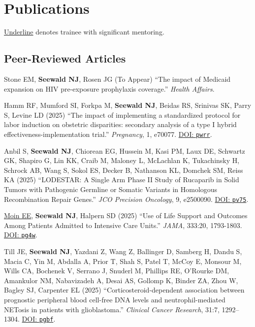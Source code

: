 \documentclass[letterpaper,11pt]{article} %
\begin{document}
	\section*{Publications}
    
    {\small \underline{Underline} denotes trainee with significant mentoring.}
    
	\subsection*{Peer-Reviewed Articles}
	
	\begin{etaremune}
        \item Stone EM, \textbf{Seewald NJ}, Rosen JG (To Appear) ``The impact of Medicaid expansion on HIV pre-exposure prophylaxis coverage.'' \textit{Health Affairs}.
        
        \item Hamm RF, Mumford SI, Forkpa M, \textbf{Seewald NJ}, Beidas RS, Srinivas SK, Parry S, Levine LD (2025) ``The impact of implementing a standardized protocol for labor induction on obstetric disparities: secondary analysis of a type I hybrid effectiveness-implementation trial.'' \textit{Pregnancy}, 1, e70077. \href{https://doi.org/pwrr}{DOI: \texttt{pwrr}}.
        
        \item Anbil S, \textbf{Seewald NJ}, Chiorean EG, Hussein M, Kasi PM, Laux DE, Schwartz GK, Shapiro G, Lin KK, Craib M, Maloney L, McLachlan K, Tukachinsky H, Schrock AB, Wang S, Sokol ES, Decker B, Nathanson KL, Domchek SM, Reiss KA (2025) ``LODESTAR: A Single Arm Phase II Study of Rucaparib in Solid Tumors with Pathogenic Germline or Somatic Variants in Homologous Recombination Repair Genes.'' \textit{JCO Precision Oncology}, 9, e2500090. \href{https://doi.org/pv75}{DOI: \texttt{pv75}}.
    
        \item \underline{Moin EE}, \textbf{Seewald NJ}, Halpern SD (2025) ``Use of Life Support and Outcomes Among Patients Admitted to Intensive Care Units.'' \textit{JAMA}, 333:20, 1793-1803. \href{https://doi.org/pg4w}{DOI: \texttt{pg4w}}.
    
        \item Till JE, \textbf{Seewald NJ}, Yazdani Z, Wang Z, Ballinger D, Samberg H, Dandu S, Macia C, Yin M, Abdalla A, Prior T, Shah S, Patel T, McCoy E, Monsour M, Wills CA, Bochenek V, Serrano J, Snuderl M, Phillips RE, O'Rourke DM, Amankulor NM, Nabavizadeh A, Desai AS, Gollomp K, Binder ZA, Zhou W, Bagley SJ, Carpenter EL (2025) ``Corticosteroid-dependent association between prognostic peripheral blood cell-free DNA levels and neutrophil-mediated NETosis in patients with glioblastoma.'' \textit{Clinical Cancer Research}, 31:7, 1292–1304. \href{https://doi.org/pgbf}{DOI: \texttt{pgbf}}.


\end{etaremune}
\end{document}
